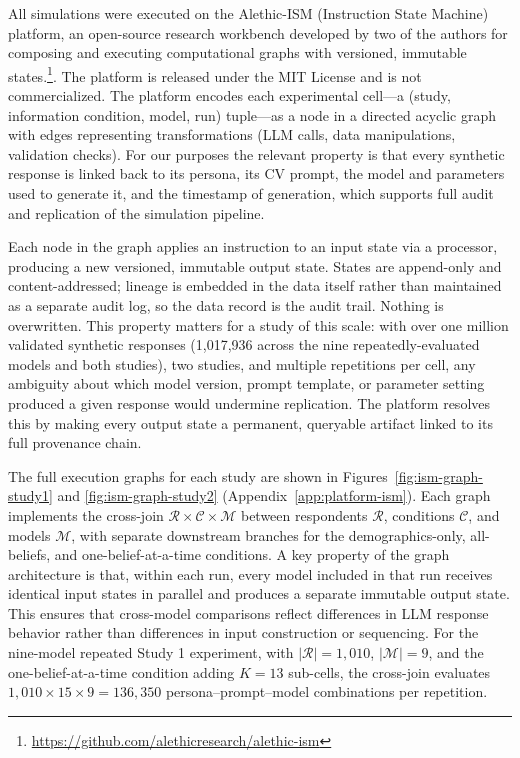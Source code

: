 \documentclass[12pt]{article}
\begin{document}
All simulations were executed on the Alethic-ISM (Instruction State Machine) platform, an open-source research workbench developed by two of the authors for composing and executing computational graphs with versioned, immutable states.\footnote{\url{https://github.com/alethicresearch/alethic-ism}}. The platform is released under the MIT License and is not commercialized.
The platform encodes each experimental cell---a (study, information
condition, model, run) tuple---as a node in a directed acyclic graph with
edges representing transformations (LLM calls, data manipulations,
validation checks). For our purposes the relevant property is that every
synthetic response is linked back to its persona, its CV prompt, the
model and parameters used to generate it, and the timestamp of generation,
which supports full audit and replication of the simulation pipeline.

Each node in the graph applies an instruction to an input state via a
processor, producing a new versioned, immutable output state. States are
append-only and content-addressed; lineage is embedded in the data itself
rather than maintained as a separate audit log, so the data record is the
audit trail. Nothing is overwritten. This property matters for a study of
this scale: with over one million validated synthetic responses
(1{,}017{,}936 across the nine repeatedly-evaluated models and both studies),
two studies, and multiple repetitions per cell, any ambiguity about which model
version, prompt template, or parameter setting produced a given response
would undermine replication. The platform resolves this by making every
output state a permanent, queryable artifact linked to its full provenance
chain.

The full execution graphs for each study are shown in
Figures~\ref{fig:ism-graph-study1} and \ref{fig:ism-graph-study2}
(Appendix~\ref{app:platform-ism}). Each graph
implements the cross-join $\mathcal{R}
\times \mathcal{C} \times \mathcal{M}$ between respondents $\mathcal{R}$,
conditions $\mathcal{C}$, and models $\mathcal{M}$, with separate downstream
branches for the demographics-only, all-beliefs, and one-belief-at-a-time
conditions. A key property of the graph architecture is that, within each
run, every model included in that run receives identical input states in
parallel and produces a separate immutable output state. This ensures that
cross-model comparisons reflect differences in LLM response behavior rather
than differences in input construction or sequencing. For the nine-model
repeated Study 1 experiment, with $|\mathcal{R}| = 1{,}010$,
$|\mathcal{M}| = 9$, and the one-belief-at-a-time condition adding
$K = 13$ sub-cells, the cross-join evaluates
$1{,}010 \times 15 \times 9 = 136{,}350$
persona--prompt--model combinations per repetition.
\end{document}
